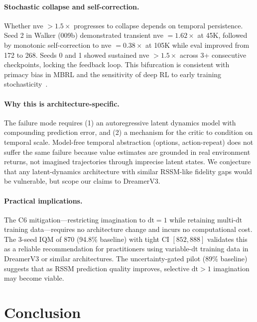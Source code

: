 \documentclass[10pt,letterpaper]{article}
\newcommand{\dt}{\mathrm{dt}}
\begin{document}
\paragraph{Stochastic collapse and self-correction.}
Whether nve $> 1.5\times$ progresses to collapse depends on temporal persistence.
Seed 2 in Walker (009b) demonstrated transient nve $= 1.62\times$ at 45K, followed by monotonic self-correction to nve $= 0.38\times$ at 105K while eval improved from 172 to 268.
Seeds 0 and 1 showed sustained nve $> 1.5\times$ across 3+ consecutive checkpoints, locking the feedback loop.
This bifurcation is consistent with primacy bias in MBRL and the sensitivity of deep RL to early training stochasticity~\citep{henderson2018deep,nikishin2022primacy}.

\paragraph{Why this is architecture-specific.}
The failure mode requires (1) an autoregressive latent dynamics model with compounding prediction error, and (2) a mechanism for the critic to condition on temporal scale.
Model-free temporal abstraction (options, action-repeat) does not suffer the same failure because value estimates are grounded in real environment returns, not imagined trajectories through imprecise latent states.
We conjecture that any latent-dynamics architecture with similar RSSM-like fidelity gaps would be vulnerable, but scope our claims to DreamerV3.

\paragraph{Practical implications.}
The C6 mitigation---restricting imagination to $\dt=1$ while retaining multi-$\dt$ training data---requires no architecture change and incurs no computational cost.
The 3-seed IQM of 870 (94.8\% baseline) with tight CI $[852, 888]$ validates this as a reliable recommendation for practitioners using variable-$\dt$ training data in DreamerV3 or similar architectures.
The uncertainty-gated pilot (89\% baseline) suggests that as RSSM prediction quality improves, selective $\dt > 1$ imagination may become viable.

\section{Conclusion}
\end{document}
